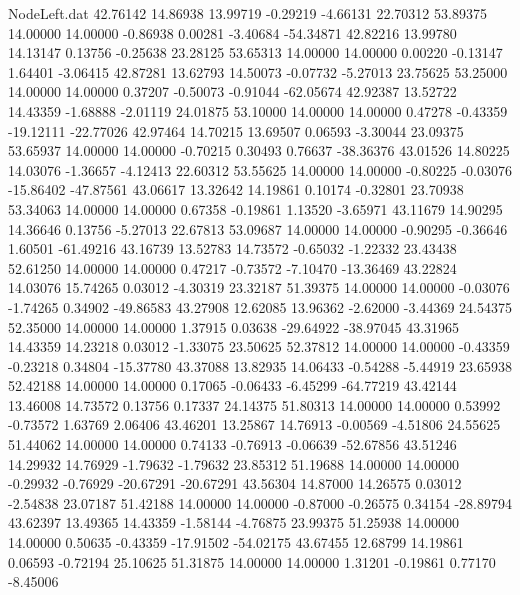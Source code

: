 \begin{filecontents}{NodeLeft.dat}
  42.76142   14.86938   13.99719    -0.29219   -4.66131   22.70312   53.89375   14.00000   14.00000   -0.86938    0.00281   -3.40684  -54.34871
  42.82216   13.99780   14.13147     0.13756   -0.25638   23.28125   53.65313   14.00000   14.00000    0.00220   -0.13147    1.64401   -3.06415
  42.87281   13.62793   14.50073    -0.07732   -5.27013   23.75625   53.25000   14.00000   14.00000    0.37207   -0.50073   -0.91044  -62.05674
  42.92387   13.52722   14.43359    -1.68888   -2.01119   24.01875   53.10000   14.00000   14.00000    0.47278   -0.43359  -19.12111  -22.77026
  42.97464   14.70215   13.69507     0.06593   -3.30044   23.09375   53.65937   14.00000   14.00000   -0.70215    0.30493    0.76637  -38.36376
  43.01526   14.80225   14.03076    -1.36657   -4.12413   22.60312   53.55625   14.00000   14.00000   -0.80225   -0.03076  -15.86402  -47.87561
  43.06617   13.32642   14.19861     0.10174   -0.32801   23.70938   53.34063   14.00000   14.00000    0.67358   -0.19861    1.13520   -3.65971
  43.11679   14.90295   14.36646     0.13756   -5.27013   22.67813   53.09687   14.00000   14.00000   -0.90295   -0.36646    1.60501  -61.49216
  43.16739   13.52783   14.73572    -0.65032   -1.22332   23.43438   52.61250   14.00000   14.00000    0.47217   -0.73572   -7.10470  -13.36469
  43.22824   14.03076   15.74265     0.03012   -4.30319   23.32187   51.39375   14.00000   14.00000   -0.03076   -1.74265    0.34902  -49.86583
  43.27908   12.62085   13.96362    -2.62000   -3.44369   24.54375   52.35000   14.00000   14.00000    1.37915    0.03638  -29.64922  -38.97045
  43.31965   14.43359   14.23218     0.03012   -1.33075   23.50625   52.37812   14.00000   14.00000   -0.43359   -0.23218    0.34804  -15.37780
  43.37088   13.82935   14.06433    -0.54288   -5.44919   23.65938   52.42188   14.00000   14.00000    0.17065   -0.06433   -6.45299  -64.77219
  43.42144   13.46008   14.73572     0.13756    0.17337   24.14375   51.80313   14.00000   14.00000    0.53992   -0.73572    1.63769    2.06406
  43.46201   13.25867   14.76913    -0.00569   -4.51806   24.55625   51.44062   14.00000   14.00000    0.74133   -0.76913   -0.06639  -52.67856
  43.51246   14.29932   14.76929    -1.79632   -1.79632   23.85312   51.19688   14.00000   14.00000   -0.29932   -0.76929  -20.67291  -20.67291
  43.56304   14.87000   14.26575     0.03012   -2.54838   23.07187   51.42188   14.00000   14.00000   -0.87000   -0.26575    0.34154  -28.89794
  43.62397   13.49365   14.43359    -1.58144   -4.76875   23.99375   51.25938   14.00000   14.00000    0.50635   -0.43359  -17.91502  -54.02175
  43.67455   12.68799   14.19861     0.06593   -0.72194   25.10625   51.31875   14.00000   14.00000    1.31201   -0.19861    0.77170   -8.45006

\end{filecontents}

